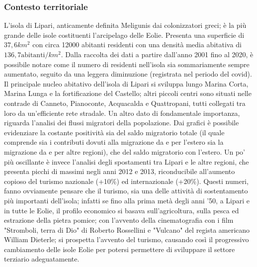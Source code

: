 \documentclass[fleqn,10pt]{SelfArx} %
\begin{document}
\subsubsection{Contesto territoriale}
L'isola di Lipari, anticamente definita Meligunis dai colonizzatori greci; è la più grande delle isole costituenti l'arcipelago delle Eolie. 
Presenta una superficie di $37,6 km^2$ con circa 12000 abitanti residenti con  una densità media abitativa di $136,7 \text{abitanti}/km^2$.  
Dalla raccolta dei dati a partire dall'anno 2001 fino al 2020, è possibile notare come il numero di residenti nell'isola sia sommariamente sempre aumentato, seguito da una leggera diminuzione (registrata nel periodo del covid). 
Il principale nucleo abitativo dell'isola di Lipari si sviluppa lungo Marina Corta, Marina Lunga e la fortificazione del Castello; altri piccoli centri sono situati nelle contrade di Canneto, Pianoconte, Acquacalda e Quattropani, tutti collegati tra loro da un'efficiente rete stradale.
Un altro dato di fondamentale importanza, riguarda l'analisi dei flussi migratori della popolazione. 
Dai grafici è possibile evidenziare la costante positività sia del saldo migratorio totale (il quale comprende sia i contributi dovuti alla migrazione da e per l'estero sia la migrazione da e per altre regioni), che del saldo migratorio con l'estero. 
Un po' più oscillante è invece l'analisi degli spostamenti tra Lipari e le altre regioni, che presenta picchi di massimi negli anni 2012 e 2013,  riconducibile all'aumento copioso del turismo nazionale (+10\%) ed internazionale (+20\%). 
Questi numeri, fanno ovviamente pensare che il turismo, sia una delle attività di sostentamento più importanti dell'isola; infatti se fino alla prima metà degli anni '50, a Lipari e in tutte le Eolie, il profilo economico si basava sull'agricoltura, sulla pesca ed estrazione della pietra pomice; con l'avvento della cinematografia con i film "Stromboli, terra di Dio" di Roberto Rossellini e "Vulcano" del regista americano William Dieterle; si prospetta l'avvento del turismo, causando così il progressivo cambiamento delle isole Eolie per potersi permettere di sviluppare il settore terziario adeguatamente. 
\end{document}

